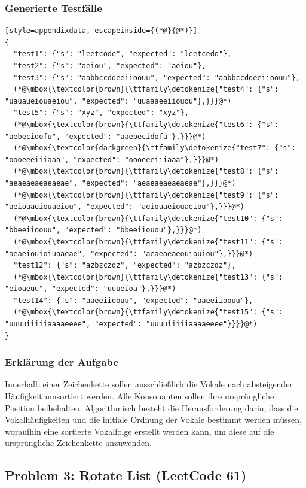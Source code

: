 \subsubsection*{Generierte Testfälle}
\begin{lstlisting}[style=appendixdata, escapeinside={(*@}{@*)}]
{
  "test1": {"s": "leetcode", "expected": "leetcedo"},
  "test2": {"s": "aeiou", "expected": "aeiou"},
  "test3": {"s": "aabbccddeeiioouu", "expected": "aabbccddeeiioouu"},
  (*@\mbox{\textcolor{brown}{\ttfamily\detokenize{"test4": {"s": "uauaueiouaeiou", "expected": "uuaaaeeiiouou"},}}}@*)
  "test5": {"s": "xyz", "expected": "xyz"},
  (*@\mbox{\textcolor{brown}{\ttfamily\detokenize{"test6": {"s": "aebecidofu", "expected": "aaebecidofu"},}}}@*)
  (*@\mbox{\textcolor{darkgreen}{\ttfamily\detokenize{"test7": {"s": "oooeeeiiiaaa", "expected": "oooeeeiiiaaa"},}}}@*)
  (*@\mbox{\textcolor{brown}{\ttfamily\detokenize{"test8": {"s": "aeaeaeaeaeaeae", "expected": "aeaeaeaeaeaeae"},}}}@*)
  (*@\mbox{\textcolor{brown}{\ttfamily\detokenize{"test9": {"s": "aeiouaeiouaeiou", "expected": "aeiouaeiouaeiou"},}}}@*)
  (*@\mbox{\textcolor{brown}{\ttfamily\detokenize{"test10": {"s": "bbeeiioouu", "expected": "bbeeiiouou"},}}}@*)
  (*@\mbox{\textcolor{brown}{\ttfamily\detokenize{"test11": {"s": "aeaeiouioiuoaeae", "expected": "aeaeaeaeouiouiou"},}}}@*)
  "test12": {"s": "azbzczdz", "expected": "azbzczdz"},
  (*@\mbox{\textcolor{brown}{\ttfamily\detokenize{"test13": {"s": "eioaeuu", "expected": "uuueioa"},}}}@*)
  "test14": {"s": "aaeeiioouu", "expected": "aaeeiioouu"},
  (*@\mbox{\textcolor{brown}{\ttfamily\detokenize{"test15": {"s": "uuuuiiiiiaaaaeeee", "expected": "uuuuiiiiiaaaaeeee"}}}}@*)
}
\end{lstlisting}

\subsubsection*{Erklärung der Aufgabe}
Innerhalb einer Zeichenkette sollen ausschließlich die Vokale nach absteigender Häufigkeit umsortiert werden. Alle Konsonanten 
sollen ihre ursprüngliche Position beibehalten. Algorithmisch besteht die Herausforderung darin, dass die Vokalhäufigkeiten und die initiale Ordnung der Vokale bestimmt 
werden müssen, woraufhin eine sortierte Vokalfolge erstellt werden kann, um diese auf die ursprüngliche Zeichenkette anzuwenden.

\clearpage

\subsection{Problem 3: Rotate List (LeetCode 61)}

